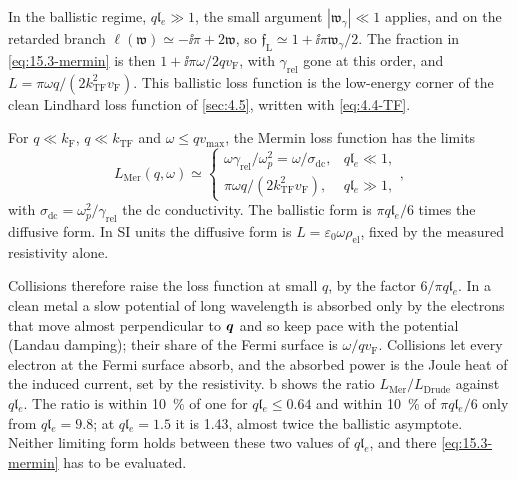 In the ballistic regime, $q\mathfrak{l}_e \gg 1$, the small argument $|\mathfrak{w}_\gamma| \ll 1$ applies, and on the retarded branch $\ell(\mathfrak{w}) \simeq -\ii\pi + 2\mathfrak{w}$, so $\mathfrak{f}_{\mathrm{L}} \simeq 1 + \ii\pi\mathfrak{w}_\gamma/2$. The fraction in \cref{eq:15.3-mermin} is then $1 + \ii\pi\omega/2qv_{\mathrm{F}}$, with $\gamma_{\mathrm{rel}}$ gone at this order, and $L = \pi\omega q/(2k_{\mathrm{TF}}^2v_{\mathrm{F}})$. This ballistic loss function is the low-energy corner of the clean Lindhard loss function of \cref{sec:4.5}, written with \cref{eq:4.4-TF}.
\begin{keyresult}
For $q \ll k_{\mathrm{F}}$, $q \ll k_{\mathrm{TF}}$ and $\omega \le qv_{\mathrm{max}}$, the Mermin loss function has the limits
\begin{equation}
  L_{\mathrm{Mer}}(q,\omega) \simeq
  \begin{cases}
    \omega\gamma_{\mathrm{rel}}/\omega_p^2 = \omega/\sigma_{\mathrm{dc}} , & q\mathfrak{l}_e \ll 1 ,\\[2pt]
    \pi\omega q/(2k_{\mathrm{TF}}^2v_{\mathrm{F}}) , & q\mathfrak{l}_e \gg 1 ,
  \end{cases}
  ,
  \label{eq:15.3-limits}
\end{equation}
with $\sigma_{\mathrm{dc}} = \omega_p^2/\gamma_{\mathrm{rel}}$ the dc conductivity. The ballistic form is $\pi q\mathfrak{l}_e/6$ times the diffusive form. In SI units the diffusive form is $L = \varepsilon_0\omega\rho_{\mathrm{el}}$, fixed by the measured resistivity alone.
\end{keyresult}
Collisions therefore raise the loss function at small $q$, by the factor $6/\pi q\mathfrak{l}_e$. In a clean metal a slow potential of long wavelength is absorbed only by the electrons that move almost perpendicular to $\bm{q}$ and so keep pace with the potential (Landau damping); their share of the Fermi surface is $\omega/qv_{\mathrm{F}}$. Collisions let every electron at the Fermi surface absorb, and the absorbed power is the Joule heat of the induced current, set by the resistivity. b shows the ratio $L_{\mathrm{Mer}}/L_{\mathrm{Drude}}$ against $q\mathfrak{l}_e$. The ratio is within \SI{10}{\percent} of one for $q\mathfrak{l}_e \le 0.64$ and within \SI{10}{\percent} of $\pi q\mathfrak{l}_e/6$ only from $q\mathfrak{l}_e = 9.8$; at $q\mathfrak{l}_e = 1.5$ it is 1.43, almost twice the ballistic asymptote. Neither limiting form holds between these two values of $q\mathfrak{l}_e$, and there \cref{eq:15.3-mermin} has to be evaluated.


